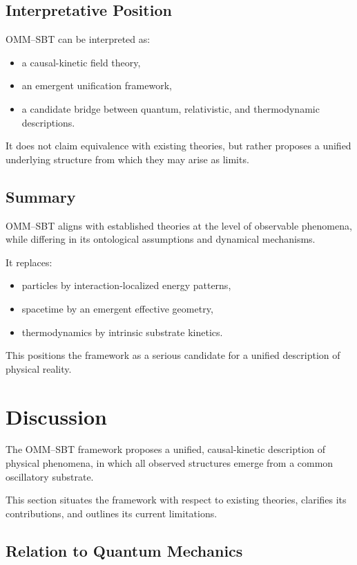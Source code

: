 \documentclass[11pt]{article}
\begin{document}
\subsection{Interpretative Position}

OMM--SBT can be interpreted as:

\begin{itemize}
\item a causal-kinetic field theory,
\item an emergent unification framework,
\item a candidate bridge between quantum, relativistic, and thermodynamic descriptions.
\end{itemize}

It does not claim equivalence with existing theories, but rather proposes a unified underlying structure from which they may arise as limits.

\subsection{Summary}

OMM--SBT aligns with established theories at the level of observable phenomena, while differing in its ontological assumptions and dynamical mechanisms.

It replaces:
\begin{itemize}
\item particles by interaction-localized energy patterns,
\item spacetime by an emergent effective geometry,
\item thermodynamics by intrinsic substrate kinetics.
\end{itemize}

This positions the framework as a serious candidate for a unified description of physical reality.

\section{Discussion}

The OMM--SBT framework proposes a unified, causal-kinetic description of physical phenomena, in which all observed structures emerge from a common oscillatory substrate.

This section situates the framework with respect to existing theories, clarifies its contributions, and outlines its current limitations.

\subsection{Relation to Quantum Mechanics}
\end{document}
